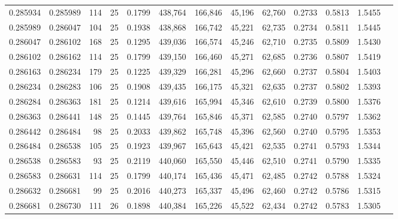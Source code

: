 \begin{tabular}{rrrrrrrrrrrrr}
0.285934 & 0.285989 &   114 &  25 &                                     0.1799 & 438,764 & 166,846 &  45,196 &  62,760 & 0.2733 & 0.5813 & 1.5455 \\
0.285989 & 0.286047 &   104 &  25 &                                     0.1938 & 438,868 & 166,742 &  45,221 &  62,735 & 0.2734 & 0.5811 & 1.5445 \\
0.286047 & 0.286102 &   168 &  25 &                                     0.1295 & 439,036 & 166,574 &  45,246 &  62,710 & 0.2735 & 0.5809 & 1.5430 \\
0.286102 & 0.286162 &   114 &  25 &                                     0.1799 & 439,150 & 166,460 &  45,271 &  62,685 & 0.2736 & 0.5807 & 1.5419 \\
0.286163 & 0.286234 &   179 &  25 &                                     0.1225 & 439,329 & 166,281 &  45,296 &  62,660 & 0.2737 & 0.5804 & 1.5403 \\
0.286234 & 0.286283 &   106 &  25 &                                     0.1908 & 439,435 & 166,175 &  45,321 &  62,635 & 0.2737 & 0.5802 & 1.5393 \\
0.286284 & 0.286363 &   181 &  25 &                                     0.1214 & 439,616 & 165,994 &  45,346 &  62,610 & 0.2739 & 0.5800 & 1.5376 \\
0.286363 & 0.286441 &   148 &  25 &                                     0.1445 & 439,764 & 165,846 &  45,371 &  62,585 & 0.2740 & 0.5797 & 1.5362 \\
0.286442 & 0.286484 &    98 &  25 &                                     0.2033 & 439,862 & 165,748 &  45,396 &  62,560 & 0.2740 & 0.5795 & 1.5353 \\
0.286484 & 0.286538 &   105 &  25 &                                     0.1923 & 439,967 & 165,643 &  45,421 &  62,535 & 0.2741 & 0.5793 & 1.5344 \\
0.286538 & 0.286583 &    93 &  25 &                                     0.2119 & 440,060 & 165,550 &  45,446 &  62,510 & 0.2741 & 0.5790 & 1.5335 \\
0.286583 & 0.286631 &   114 &  25 &                                     0.1799 & 440,174 & 165,436 &  45,471 &  62,485 & 0.2742 & 0.5788 & 1.5324 \\
0.286632 & 0.286681 &    99 &  25 &                                     0.2016 & 440,273 & 165,337 &  45,496 &  62,460 & 0.2742 & 0.5786 & 1.5315 \\
0.286681 & 0.286730 &   111 &  26 &                                     0.1898 & 440,384 & 165,226 &  45,522 &  62,434 & 0.2742 & 0.5783 & 1.5305 \\

\end{tabular}
